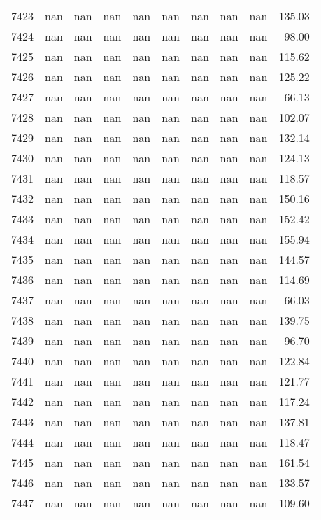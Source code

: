 \begin{tabular}{lrrrrrrrrr}
7423 & nan & nan & nan & nan & nan & nan & nan & nan & 135.03 \\
7424 & nan & nan & nan & nan & nan & nan & nan & nan & 98.00 \\
7425 & nan & nan & nan & nan & nan & nan & nan & nan & 115.62 \\
7426 & nan & nan & nan & nan & nan & nan & nan & nan & 125.22 \\
7427 & nan & nan & nan & nan & nan & nan & nan & nan & 66.13 \\
7428 & nan & nan & nan & nan & nan & nan & nan & nan & 102.07 \\
7429 & nan & nan & nan & nan & nan & nan & nan & nan & 132.14 \\
7430 & nan & nan & nan & nan & nan & nan & nan & nan & 124.13 \\
7431 & nan & nan & nan & nan & nan & nan & nan & nan & 118.57 \\
7432 & nan & nan & nan & nan & nan & nan & nan & nan & 150.16 \\
7433 & nan & nan & nan & nan & nan & nan & nan & nan & 152.42 \\
7434 & nan & nan & nan & nan & nan & nan & nan & nan & 155.94 \\
7435 & nan & nan & nan & nan & nan & nan & nan & nan & 144.57 \\
7436 & nan & nan & nan & nan & nan & nan & nan & nan & 114.69 \\
7437 & nan & nan & nan & nan & nan & nan & nan & nan & 66.03 \\
7438 & nan & nan & nan & nan & nan & nan & nan & nan & 139.75 \\
7439 & nan & nan & nan & nan & nan & nan & nan & nan & 96.70 \\
7440 & nan & nan & nan & nan & nan & nan & nan & nan & 122.84 \\
7441 & nan & nan & nan & nan & nan & nan & nan & nan & 121.77 \\
7442 & nan & nan & nan & nan & nan & nan & nan & nan & 117.24 \\
7443 & nan & nan & nan & nan & nan & nan & nan & nan & 137.81 \\
7444 & nan & nan & nan & nan & nan & nan & nan & nan & 118.47 \\
7445 & nan & nan & nan & nan & nan & nan & nan & nan & 161.54 \\
7446 & nan & nan & nan & nan & nan & nan & nan & nan & 133.57 \\
7447 & nan & nan & nan & nan & nan & nan & nan & nan & 109.60 \\

\end{tabular}
